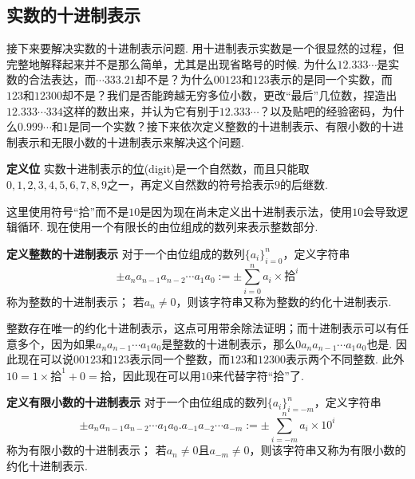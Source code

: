 \documentclass[UTF8]{ctexart}
\newenvironment{definition}[1]
    {\begin{tcolorbox}[enhanced, colback=LightYellow, breakable=false, frame hidden, borderline west={1.5mm}{-2mm}{DarkGreen}]
    {\bfseries {\color{DarkGreen} 定义}\quad #1} \newline}
    {\end{tcolorbox}}
\begin{document}
\subsection{实数的十进制表示}

接下来要解决实数的十进制表示问题. 用十进制表示实数是一个很显然的过程，但完整地解释起来并不是那么简单，尤其是出现省略号的时候. 为什么\(12.333\cdots\)是实数的合法表达，而\(\cdots333.21\)却不是？为什么\(00123\)和\(123\)表示的是同一个实数，而\(123\)和\(12300\)却不是？我们是否能跨越无穷多位小数，更改“最后”几位数，捏造出\(12.333\cdots334\)这样的数出来，并认为它有别于\(12.333\cdots\)？以及贴吧的经验密码，为什么\(0.999\cdots\)和\(1\)是同一个实数？接下来依次定义整数的十进制表示、有限小数的十进制表示和无限小数的十进制表示来解决这个问题.

\begin{definition}{位}
    实数十进制表示的\uline{位}(digit)是一个自然数，而且只能取\(0,1,2,3,4,5,6,7,8,9\)之一，再定义自然数的符号\(\mbox{拾}\)表示\(9\)的后继数.
\end{definition}

这里使用符号“拾”而不是\(10\)是因为现在尚未定义出十进制表示法，使用\(10\)会导致逻辑循环. 现在使用一个有限长的由位组成的数列来表示整数部分.

\begin{definition}{整数的十进制表示}
    对于一个由位组成的数列\(\{a_i\}_{i=0}^n\)，定义字符串
    \[\pm a_n a_{n-1} a_{n-2} \cdots a_1 a_0 := \pm \sum_{i=0}^{n} a_i \times \mbox{拾}^i\]
    称为整数的十进制表示；
    \newline
    若\(a_n \neq 0\)，则该字符串又称为整数的约化十进制表示.
\end{definition}

整数存在唯一的约化十进制表示，这点可用带余除法证明；而十进制表示可以有任意多个，因为如果\(a_n a_{n-1}\cdots a_1 a_0\)是整数的十进制表示，那么\(0a_n a_{n-1}\cdots a_1 a_0\)也是. 因此现在可以说\(00123\)和\(123\)表示同一个整数，而\(123\)和\(12300\)表示两个不同整数. 此外\(10=1 \times \mbox{拾}^1+0=\mbox{拾}\)，因此现在可以用\(10\)来代替字符“拾”了.

\begin{definition}{有限小数的十进制表示}
    对于一个由位组成的数列\(\{a_i\}_{i=-m}^n\)，定义字符串
    \[\pm a_n a_{n-1} a_{n-2} \cdots a_1 a_0.a_{-1} a_{-2} \cdots a_{-m}:= \pm \sum_{i=-m}^{n} a_i \times 10^i\]
    称为有限小数的十进制表示；
    \newline
    若\(a_n \neq 0\)且\(a_{-m} \neq 0\)，则该字符串又称为有限小数的约化十进制表示.
\end{definition}
\end{document}
